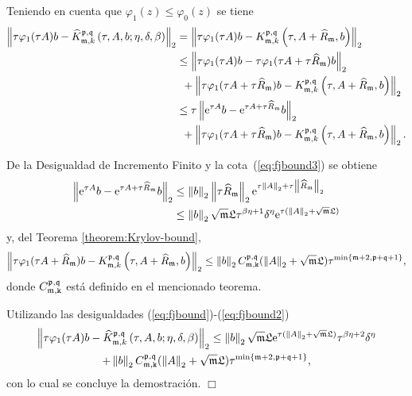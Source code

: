 Teniendo en cuenta que $\varphi_1(z) \leq \varphi_0(z)$ se tiene
\begin{align}
	\left\lVert \tau \varphi_1(\tau A)b -\widehat{K}_{\mathfrak{m},k}^{\mathfrak{p},\mathfrak{q}}\left( \tau, A , b; \eta, \delta, \beta \right) \right\rVert_2 & = \left\lVert \tau \varphi_1(\tau A)b -K_{\mathfrak{m},k}^{\mathfrak{p},\mathfrak{q}}\left( \tau, A+\widehat{R}_{\mathfrak{m}} , b \right) \right\rVert_2 \nonumber \\
	& \leq \left\lVert \tau \varphi_1(\tau A)b - \tau \varphi_1(\tau A + \tau \widehat{R}_{\mathfrak{m}})b \right\rVert_2 \nonumber \\
	& \enspace + \left\lVert \tau \varphi_1(\tau A + \tau \widehat{R}_{\mathfrak{m}})b-K_{\mathfrak{m},k}^{\mathfrak{p},\mathfrak{q}}\left( \tau, A+\widehat{R}_{\mathfrak{m}} , b \right) \right\rVert_2 \nonumber\\
	& \leq \tau \left\lVert \mathrm{e}^{\tau A}b - \mathrm{e}^{\tau A + \tau \widehat{R}_{\mathfrak{m}}}b \right\rVert_2 \nonumber \\
	& \enspace + \left\lVert \tau \varphi_1(\tau A + \tau \widehat{R}_{\mathfrak{m}})b-K_{\mathfrak{m},k}^{\mathfrak{p},\mathfrak{q}}\left( \tau, A+\widehat{R}_{\mathfrak{m}} , b \right) \right\rVert_2. \label{eq:fjbound}
\end{align}

De la Desigualdad de Incremento Finito y la cota~(\ref{eq:fjbound3}) se obtiene
\begin{align}
	\left\lVert \mathrm{e}^{\tau A}b - \mathrm{e}^{\tau A + \tau \widehat{R}_{\mathfrak{m}}}b \right\rVert_2&\leq \left\lVert b \right\rVert_2 \left\lVert \tau \widehat{R}_{\mathfrak{m}} \right\rVert_2\mathrm{e}^{\tau\left\lVert A \right\rVert_2+\tau\left\lVert \widehat{R}_{\mathfrak{m}} \right\rVert_2} \\ &\leq \left\lVert b \right\rVert_2   \sqrt{\mathfrak{m}}\mathfrak{L} \tau^{\beta\eta+1}\delta^\eta\mathrm{e}^{\tau(\left\lVert A \right\rVert_2+\sqrt{\mathfrak{m}}\mathfrak{L})} \nonumber\label{eq:fjbound1}
\end{align}
y, del Teorema \ref{theorem:Krylov-bound},
\vspace{-0.25cm}
\begin{equation}
	\left\lVert \tau \varphi_1(\tau A+\widehat{R}_{\mathfrak{m}})b-K_{\mathfrak{m},k}^{\mathfrak{p},\mathfrak{q}}\left( \tau, A+\widehat{R}_{\mathfrak{m}} , b \right) \right\rVert_2  \leq \left\lVert b \right\rVert_2C_{\mathfrak{m},\mathtt{k}}^{\mathfrak{p},\mathfrak{q}}(\left\lVert A \right\rVert_2+\sqrt{\mathfrak{m}}\mathfrak{L})\tau^{\min\{\mathfrak{m}+2,\mathfrak{p}+\mathfrak{q}+1\}}, \label{eq:fjbound2}
\end{equation}
donde $C_{\mathfrak{m},\mathtt{k}}^{\mathfrak{p},\mathfrak{q}}$ está definido en el mencionado teorema.

Utilizando las desigualdades (\ref{eq:fjbound})-(\ref{eq:fjbound2})
\vspace{-0.25cm}
\begin{multline*}
	\left\lVert \tau \varphi_1(\tau A)b -\widehat{K}_{\mathfrak{m},k}^{\mathfrak{p},\mathfrak{q}}\left( \tau, A , b; \eta, \delta, \beta \right) \right\rVert_2 \leq
	\left\lVert b \right\rVert_2 \sqrt{\mathfrak{m}}\mathfrak{L} \mathrm{e}^{\tau(\left\lVert A \right\rVert_2+\sqrt{\mathfrak{m}}\mathfrak{L})} \tau^{\beta\eta+2}\delta^\eta \\ + \left\lVert b \right\rVert_2C_{\mathfrak{m},\mathtt{k}}^{\mathfrak{p},\mathfrak{q}}(\left\lVert A \right\rVert_2+\sqrt{\mathfrak{m}}\mathfrak{L})\tau^{\min\{\mathfrak{m}+2,\mathfrak{p}+\mathfrak{q}+1\}} ,
\end{multline*}
con lo cual se concluye la demostración. $\Box$\\

